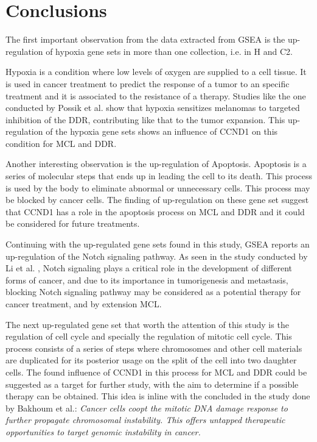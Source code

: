 
\section{Conclusions}

The first important observation from the data extracted from GSEA is the up-regulation of hypoxia gene sets in more than one collection, i.e. in H and C2.

Hypoxia is a condition where low levels of oxygen are supplied to a cell tissue. It is used in cancer treatment to predict the response of a tumor to an specific treatment and it is associated to the resistance of a therapy. Studies like the one conducted by Possik et al. \cite{Possik2014} show that hypoxia sensitizes melanomas to targeted inhibition of the DDR, contributing like that to the tumor expansion.
This up-regulation of the hypoxia gene sets shows an influence of CCND1 on this condition for MCL and DDR.

Another interesting observation is the up-regulation of Apoptosis. Apoptosis is a series of molecular steps that ends up in leading the cell to its death. This process is used by the body to eliminate abnormal or unnecessary cells. This process may be blocked by cancer cells.
The finding of up-regulation on these gene set suggest that CCND1 has a role in the apoptosis process on MCL and DDR and it could be considered for future treatments.

Continuing with the up-regulated gene sets found in this study, GSEA reports an up-regulation of the Notch signaling pathway. As seen in the study conducted by Li et al. \cite{Li2017}, Notch signaling plays a critical role in the development of different forms of cancer, and due to its importance in tumorigenesis and metastasis, blocking Notch signaling pathway may be considered as a potential therapy for cancer treatment, and by extension MCL.

The next up-regulated gene set that worth the attention of this study is the regulation of cell cycle and specially the regulation of mitotic cell cycle. This process consists of a series of steps where chromosomes and other cell materials are duplicated for its posterior usage on the split of the cell into two daughter cells.
The found influence of CCND1 in this process for MCL and DDR could be suggested as a target for further study, with the aim to determine if a possible therapy can be obtained. This idea is inline with the concluded in the study done by Bakhoum et al.: \textit{Cancer cells coopt the mitotic DNA damage response to further propagate chromosomal instability. This offers untapped therapeutic opportunities to target genomic instability in cancer.}\cite{Bakhoum2017}


